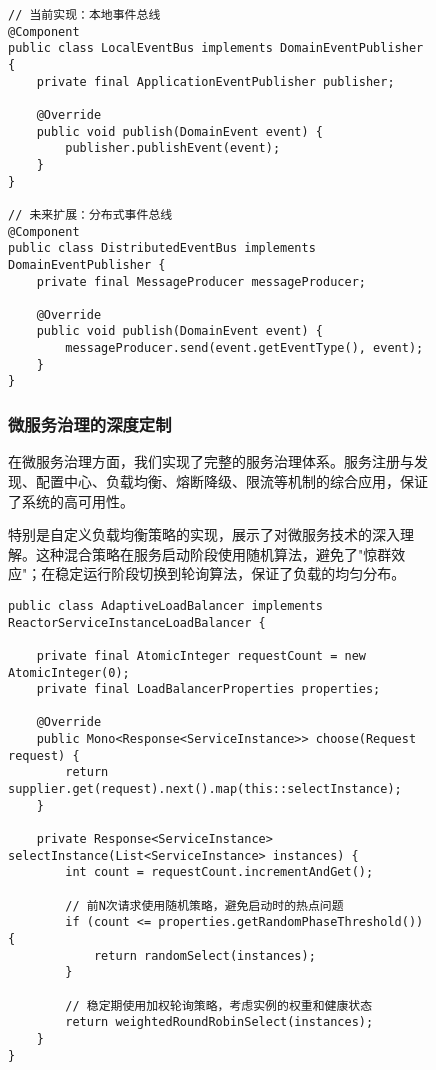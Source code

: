 \documentclass[a4paper,12pt]{article}
\begin{document}
\begin{figure}[H]
\begin{lstlisting}[caption=事件驱动架构的演进路径]
// 当前实现：本地事件总线
@Component  
public class LocalEventBus implements DomainEventPublisher {
    private final ApplicationEventPublisher publisher;
    
    @Override
    public void publish(DomainEvent event) {
        publisher.publishEvent(event);
    }
}

// 未来扩展：分布式事件总线
@Component
public class DistributedEventBus implements DomainEventPublisher {
    private final MessageProducer messageProducer;
    
    @Override
    public void publish(DomainEvent event) {
        messageProducer.send(event.getEventType(), event);
    }
}
\end{lstlisting}

\subsubsection{微服务治理的深度定制}

在微服务治理方面，我们实现了完整的服务治理体系。服务注册与发现、配置中心、负载均衡、熔断降级、限流等机制的综合应用，保证了系统的高可用性。

特别是自定义负载均衡策略的实现，展示了对微服务技术的深入理解。这种混合策略在服务启动阶段使用随机算法，避免了"惊群效应"；在稳定运行阶段切换到轮询算法，保证了负载的均匀分布。

\begin{lstlisting}[caption=智能负载均衡策略]
public class AdaptiveLoadBalancer implements ReactorServiceInstanceLoadBalancer {
    
    private final AtomicInteger requestCount = new AtomicInteger(0);
    private final LoadBalancerProperties properties;
    
    @Override
    public Mono<Response<ServiceInstance>> choose(Request request) {
        return supplier.get(request).next().map(this::selectInstance);
    }
    
    private Response<ServiceInstance> selectInstance(List<ServiceInstance> instances) {
        int count = requestCount.incrementAndGet();
        
        // 前N次请求使用随机策略，避免启动时的热点问题
        if (count <= properties.getRandomPhaseThreshold()) {
            return randomSelect(instances);
        }
        
        // 稳定期使用加权轮询策略，考虑实例的权重和健康状态
        return weightedRoundRobinSelect(instances);
    }
}
\end{lstlisting}


\end{figure}
\end{document}
